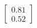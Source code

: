 \documentclass[preview]{standalone}
\begin{document}
\begin{align*}
\begin{bmatrix} 0.81 \\ 0.52 \end{bmatrix}
\end{align*}
\end{document}
